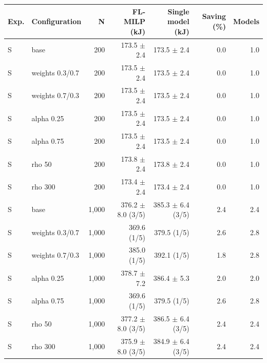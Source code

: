 \begin{tabular}{llrrrrr}
\toprule
Exp. & Configuration & N & FL-MILP (kJ) & Single model (kJ) & Saving (\%) & Models \\
\midrule
S & base & 200 & 173.5 $\pm$ 2.4 & 173.5 $\pm$ 2.4 & 0.0 & 1.0 \\
S & weights 0.3/0.7 & 200 & 173.5 $\pm$ 2.4 & 173.5 $\pm$ 2.4 & 0.0 & 1.0 \\
S & weights 0.7/0.3 & 200 & 173.5 $\pm$ 2.4 & 173.5 $\pm$ 2.4 & 0.0 & 1.0 \\
S & alpha 0.25 & 200 & 173.5 $\pm$ 2.4 & 173.5 $\pm$ 2.4 & 0.0 & 1.0 \\
S & alpha 0.75 & 200 & 173.5 $\pm$ 2.4 & 173.5 $\pm$ 2.4 & 0.0 & 1.0 \\
S & rho 50 & 200 & 173.8 $\pm$ 2.4 & 173.8 $\pm$ 2.4 & 0.0 & 1.0 \\
S & rho 300 & 200 & 173.4 $\pm$ 2.4 & 173.4 $\pm$ 2.4 & 0.0 & 1.0 \\
S & base & 1,000 & 376.2 $\pm$ 8.0 (3/5) & 385.3 $\pm$ 6.4 (3/5) & 2.4 & 2.4 \\
S & weights 0.3/0.7 & 1,000 & 369.6 (1/5) & 379.5 (1/5) & 2.6 & 2.8 \\
S & weights 0.7/0.3 & 1,000 & 385.0 (1/5) & 392.1 (1/5) & 1.8 & 2.8 \\
S & alpha 0.25 & 1,000 & 378.7 $\pm$ 7.2 & 386.4 $\pm$ 5.3 & 2.0 & 2.0 \\
S & alpha 0.75 & 1,000 & 369.6 (1/5) & 379.5 (1/5) & 2.6 & 2.8 \\
S & rho 50 & 1,000 & 377.2 $\pm$ 8.0 (3/5) & 386.5 $\pm$ 6.4 (3/5) & 2.4 & 2.4 \\
S & rho 300 & 1,000 & 375.9 $\pm$ 8.0 (3/5) & 384.9 $\pm$ 6.4 (3/5) & 2.4 & 2.4 \\
\bottomrule
\end{tabular}
